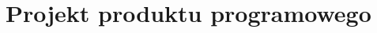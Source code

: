 \documentclass[../main.tex]{subfiles}
\begin{document}
\section{Projekt produktu programowego}
\end{document}
